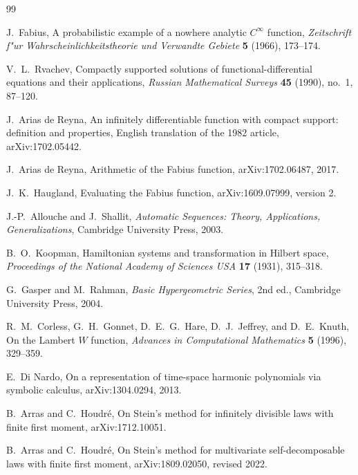 \documentclass[11pt,a4paper]{article}
\theoremstyle{definition}
\theoremstyle{remark}
\begin{document}
\begin{thebibliography}{99}

J.~Fabius,
\newblock A probabilistic example of a nowhere analytic $C^\infty$ function,
\newblock \emph{Zeitschrift f"ur Wahrscheinlichkeitstheorie und Verwandte Gebiete} \textbf{5} (1966), 173--174.

V.~L.~Rvachev,
\newblock Compactly supported solutions of functional-differential equations and their applications,
\newblock \emph{Russian Mathematical Surveys} \textbf{45} (1990), no.~1, 87--120.

J.~Arias de Reyna,
\newblock An infinitely differentiable function with compact support: definition and properties,
\newblock English translation of the 1982 article, arXiv:1702.05442.

J.~Arias de Reyna,
\newblock Arithmetic of the Fabius function,
\newblock arXiv:1702.06487, 2017.

J.~K.~Haugland,
\newblock Evaluating the Fabius function,
\newblock arXiv:1609.07999, version 2.

J.-P.~Allouche and J.~Shallit,
\newblock \emph{Automatic Sequences: Theory, Applications, Generalizations},
\newblock Cambridge University Press, 2003.

B.~O.~Koopman,
\newblock Hamiltonian systems and transformation in Hilbert space,
\newblock \emph{Proceedings of the National Academy of Sciences USA} \textbf{17} (1931), 315--318.

G.~Gasper and M.~Rahman,
\newblock \emph{Basic Hypergeometric Series}, 2nd ed.,
\newblock Cambridge University Press, 2004.

R.~M.~Corless, G.~H.~Gonnet, D.~E.~G.~Hare, D.~J.~Jeffrey, and D.~E.~Knuth,
\newblock On the Lambert $W$ function,
\newblock \emph{Advances in Computational Mathematics} \textbf{5} (1996), 329--359.

E.~Di Nardo,
\newblock On a representation of time-space harmonic polynomials via symbolic calculus,
\newblock arXiv:1304.0294, 2013.

B.~Arras and C.~Houdr\'e,
\newblock On Stein's method for infinitely divisible laws with finite first moment,
\newblock arXiv:1712.10051.

B.~Arras and C.~Houdr\'e,
\newblock On Stein's method for multivariate self-decomposable laws with finite first moment,
\newblock arXiv:1809.02050, revised 2022.


\end{thebibliography}
\end{document}
